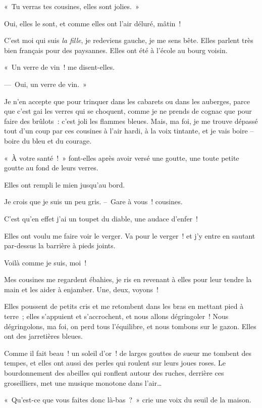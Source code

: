 \documentclass[french,twoside]{book} %
\begin{document}
« Tu verras tes cousines, elles sont jolies. »\par
\bigbreak
\noindent Oui, elles le sont, et comme elles ont l’air déluré, mâtin !\par
C’est moi qui suis \emph{la fille}, je redeviens gauche, je me sens bête. Elles parlent très bien français pour des paysannes. Elles ont été à l’école au bourg voisin.\par
« Un verre de vin ! me disent-elles.\par
— Oui, un verre de vin. »\par
Je n’en accepte que pour trinquer dans les cabarets ou dans les auberges, parce que c’est gai les verres qui se choquent, comme je ne prends de cognac que pour faire des brûlots : c’est joli les flammes bleues. Mais, ma foi, je me trouve dépassé tout d’un coup par ces cousines à l’air hardi, à la voix tintante, et je vais boire – boire du bleu et du courage.\par
« À votre santé ! » font-elles après avoir versé une goutte, une toute petite goutte au fond de leurs verres.\par
Elles ont rempli le mien jusqu’au bord.\par
Je crois que je suis un peu gris. – Gare à vous ! cousines.\par
C’est qu’en effet j’ai un toupet du diable, une audace d’enfer !\par
\bigbreak
\noindent Elles ont voulu me faire voir le verger. Va pour le verger ! et j’y entre en sautant par-dessus la barrière à pieds joints.\par
Voilà comme je suis, moi !\par
Mes cousines me regardent ébahies, je ris en revenant à elles pour leur tendre la main et les aider à enjamber. Une, deux, voyons !\par
Elles poussent de petits cris et me retombent dans les bras en mettant pied à terre ; elles s’appuient et s’accrochent, et nous allons dégringoler ! Nous dégringolons, ma foi, on perd tous l’équilibre, et nous tombons sur le gazon. Elles ont des jarretières bleues.\par
Comme il fait beau ! un soleil d’or ! de larges gouttes de sueur me tombent des tempes, et elles ont aussi des perles qui roulent sur leurs joues roses. Le bourdonnement des abeilles qui ronflent autour des ruches, derrière ces groseilliers, met une musique monotone dans l’air…\par
\bigbreak
\noindent « Qu’est-ce que vous faites donc là-bas ? » crie une voix du seuil de la maison.\par
\end{document}
